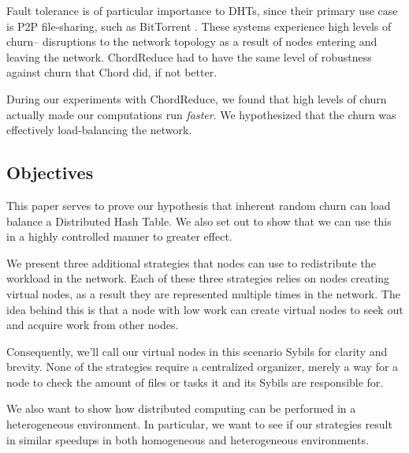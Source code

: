 \documentclass[11pt,conference]{IEEEtran}
\begin{document}
Fault tolerance is of particular importance to DHTs, since their primary use case is P2P file-sharing, such as BitTorrent \cite{bittorrent}.
These systems experience high levels of churn-- disruptions to the network topology as a result of nodes entering and leaving the network.
ChordReduce had to have the same level of robustness against churn that Chord did, if not better.

During our experiments with ChordReduce, we found that high levels of churn actually made our computations run \textit{faster}.
We hypothesized that the churn was effectively load-balancing the network.

\subsection*{Objectives}
This paper serves to prove our hypothesis that inherent random churn can load balance a Distributed Hash Table.
We also set out to show that we can use this in a highly controlled manner to greater effect.

We present three additional strategies that nodes can use to redistribute the workload in the network.
Each of these three strategies relies on nodes creating virtual nodes, as a result they are represented multiple times in the network.
The idea behind this is that a node with low work can create virtual nodes to seek out and acquire work from other nodes.

Consequently, we'll call our virtual nodes in this scenario Sybils for clarity and brevity.
None of the strategies require a centralized organizer, merely a way for a node to check the amount of files or tasks it and its Sybils are responsible for.


We also want to show how distributed computing can be performed in a heterogeneous environment.
In particular, we want to see if our strategies result in similar speedups in both homogeneous and heterogeneous environments.

%
%
\end{document}
